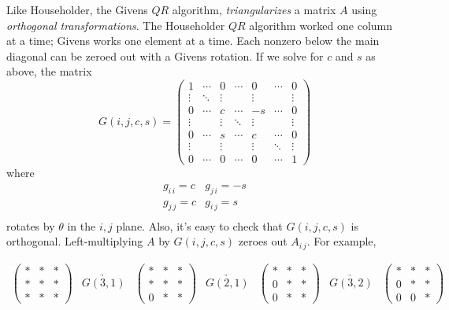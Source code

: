 Like Householder, the Givens $QR$ algorithm, \emph{triangularizes} a matrix $A$ using \emph{orthogonal transformations}. The Householder $QR$ algorithm worked one column at a time; Givens works one element at a time. Each nonzero below the main diagonal can be zeroed out with a Givens rotation. If we solve for $c$ and $s$ as above, the matrix
\begin{equation*}
G(i,j,c,s) = 
\begin{pmatrix}
1   & \cdots & 0 & \cdots & 0 & \cdots & 0 \\
 \vdots & \ddots & \vdots &  & \vdots & & \vdots \\
0   & \cdots &    c   & \cdots &    -s   & \cdots &    0   \\
 \vdots &        & \vdots & \ddots & \vdots &        & \vdots \\
 0   & \cdots &   s   & \cdots &    c   & \cdots &    0   \\
\vdots &        & \vdots &        & \vdots & \ddots & \vdots \\
0   & \cdots &    0   & \cdots &    0   & \cdots &    1 
\end{pmatrix}
\end{equation*}
where
\[ \begin{array}{ll}
g_{i\, i} = c  & g_{j\, i}= -s   \\
g_{j\, j} = c &  g_{i\, j}= s  \\
\end{array}\]
rotates by $\theta$ in the $i,j$ plane. Also, it's easy to check that $G(i,j,c,s)$ is orthogonal. Left-multiplying $A$ by $G(i,j,c,s)$ zeroes out $A_{i\, j}$. For example, 

\[
\begin{array}{ccccccc}
\begin{pmatrix}
*&*&*\\
*&*&*\\
*&*&*
\end{pmatrix}
&
\underrightarrow{G(3,1)}
&\begin{pmatrix}
*&*&*\\
*&*&*\\
0&*&*
\end{pmatrix}
&
\underrightarrow{G(2,1)}
&\begin{pmatrix}
*&*&*\\
0&*&*\\
0&*&*
\end{pmatrix}
&
\underrightarrow{G(3,2)}
&\begin{pmatrix}
*&*&*\\
0&*&*\\
0&0&*
\end{pmatrix}
\end{array}
\]

